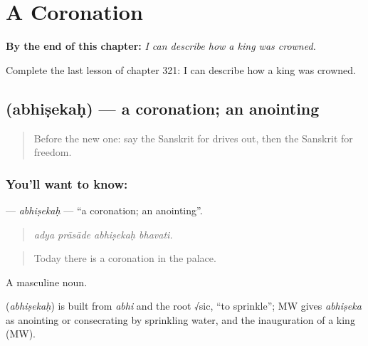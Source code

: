 
\chapter{A Coronation}
\label{ch:sa-a-coronation}

\begin{chapteropening}
\textbf{By the end of this chapter:} \emph{I can describe how a king was crowned.}

Complete the last lesson of chapter 321: I can describe how a king was crowned.
\end{chapteropening}

\section[\texorpdfstring{\sk{अभिषेकः} (abhiṣekaḥ)}{अभिषेकः (abhiṣekaḥ)}]{ (abhiṣekaḥ) — a coronation; an anointing}

\label{lesson:SA-C321-abhisekah}



\begin{quote}
Before the new one: say the Sanskrit for drives out, then the Sanskrit for freedom.
\end{quote}

\subsection*{You'll want to know: }
\textbf{} — \emph{abhiṣekaḥ} — \textquotedblleft{}a coronation; an anointing\textquotedblright{}.

\begin{quote}
   
\end{quote}

\begin{quote}
\emph{adya prāsāde abhiṣekaḥ bhavati.}
\end{quote}

\begin{quote}
Today there is a coronation in the palace.
\end{quote}

A masculine noun.

\begin{cousinweb}
\textbf{} (\emph{abhiṣekaḥ}) is built from \emph{abhi} and the root √sic, \textquotedblleft{}to sprinkle\textquotedblright{}; MW gives \emph{abhiṣeka} as anointing or consecrating by sprinkling water, and the inauguration of a king (MW).
\end{cousinweb}

